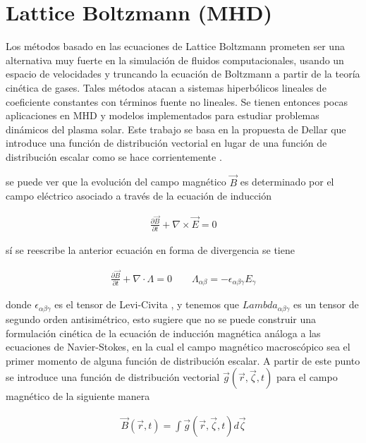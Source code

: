 \chapter{Lattice Boltzmann (MHD)}


\noindent Los métodos basado en las ecuaciones de Lattice Boltzmann prometen ser una alternativa muy fuerte en la simulación de fluidos computacionales, usando un espacio de velocidades y truncando la ecuación de Boltzmann a partir de la teoría cinética de gases. Tales métodos atacan a sistemas hiperbólicos lineales de coeficiente constantes con términos fuente no lineales. Se tienen entonces pocas aplicaciones en MHD y modelos implementados para estudiar problemas dinámicos del plasma solar. Este trabajo se basa en la propuesta de Dellar \cite{Dellar} que introduce una función de distribución vectorial en lugar de una función de distribución escalar como se hace corrientemente \cite{kruger}.  

\noindent se puede ver que la evolución del campo magnético $\vec{B}$ es determinado por el campo eléctrico asociado a través de la ecuación de inducción

\begin{eqnarray}
    \frac{\partial \vec{B}}{\partial t} + \nabla \times \vec{E} = 0 \nonumber 
\end{eqnarray}

\noindent sí se reescribe la anterior ecuación en forma de divergencia se tiene 

\begin{eqnarray}
    \frac{\partial \vec{B}}{\partial t} + \nabla\cdot\Lambda = 0 \qquad \Lambda_{\alpha\beta}=-\epsilon_{\alpha\beta\gamma}E_{\gamma}
\end{eqnarray}

\noindent donde $\epsilon_{\alpha\beta\gamma}$ es el tensor  de Levi-Civita , y tenemos que $Lambda_{\alpha\beta\gamma}$ es un tensor de segundo orden antisimétrico, esto sugiere que no se puede construir una formulación cinética de la ecuación de inducción magnética análoga a las ecuaciones de Navier-Stokes, en la cual el campo magnético macroscópico sea el primer momento de alguna función de distribución escalar. A partir de este punto se introduce una función de distribución vectorial $\vec{g}(\vec{r},\vec{\zeta},t)$ para el campo magnético de la siguiente manera

\begin{eqnarray}
    \vec{B}(\vec{r},t) = \int \vec{g}(\vec{r},\vec{\zeta},t)d\vec{\zeta}
\end{eqnarray}

